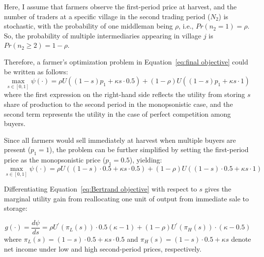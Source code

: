 Here, I assume that farmers observe the first-period price at harvest, and the number of traders at a specific village in the second trading period ($N_2$) is stochastic, with the probability of one middleman being $\rho$, i.e., $Pr(n_2=1)=\rho$. So, the probability of multiple intermediaries appearing in village $j$ is $Pr(n_2 \geq 2) = 1-\rho$.

Therefore, a farmer's optimization problem in Equation~\ref{eq:final objective} could be written as follows:
\begin{equation}
\max_{s \in [0,1]} \psi(\cdot) = \rho U((1-s)p_1 + \kappa s \cdot 0.5) + (1-\rho) U \left( (1-s)p_1 +  \kappa s \cdot 1 \right)
\end{equation}
where the first expression on the right-hand side reflects the utility from storing $s$ share of production to the second period in the monopsonistic case, and the second term represents the utility in the case of perfect competition among buyers. 

Since all farmers would sell immediately at harvest when multiple buyers are present ($p_1 = 1$), the problem can be further simplified by setting the first-period price as the monopsonistic price ($p_1 = 0.5$), yielding:
\begin{equation}
\label{eq:Bertrand objective}
\max_{s \in [0,1]} \psi(\cdot) = \rho U((1-s)\cdot0.5 + \kappa s \cdot 0.5) + (1-\rho) U \left( (1-s)\cdot0.5 +  \kappa s \cdot 1 \right)
\end{equation}

Differentiating Equation~\ref{eq:Bertrand objective} with respect to $s$ gives the marginal utility gain from reallocating one unit of output from immediate sale to storage:

\begin{equation}
g(\cdot) = \frac{d\psi}{ds} = \rho U^{\prime}(\pi_L(s)) \cdot 0.5(\kappa-1) + (1 - \rho) U^{\prime}(\pi_H(s)) \cdot (\kappa-0.5)
\label{Eq: bertrand FOC}
\end{equation}
where $\pi_L(s) = (1 - s)\cdot 0.5 + \kappa s \cdot 0.5$ and $\pi_H(s) = (1 - s)\cdot 0.5 + \kappa s$ denote net income under low and high second-period prices, respectively.

